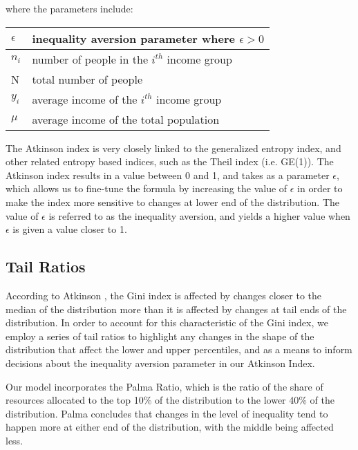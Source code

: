 \documentclass[conference]{IEEEtran}
\begin{document}
\vspace{12pt}

where the parameters include:

\vspace{6pt}

\begin{center}
\begin{tabular}{|l|l|}
\hline
$\epsilon$ & inequality aversion parameter where $\epsilon>0$ \\ \hline
$n_{i}$ & number of people in the $i^{th}$ income group \\ \hline
N & total number of people \\ \hline
$y_{i}$ & average income of the $i^{th}$ income group \\ \hline
$\mu$ & average income of the total population \\ \hline
\end{tabular}
\end{center}

\vspace{6pt}

The Atkinson index is very closely linked to the generalized entropy index, and other related entropy based indices, such as the Theil index (i.e. GE(1)).  The Atkinson index results in a value between 0 and 1, and takes as a parameter $\epsilon$, which allows us to fine-tune the formula by increasing the value of $\epsilon$ in order to make the index more sensitive to changes at lower end of the distribution.  The value of $\epsilon$ is referred to as the inequality aversion, and yields a higher value when $\epsilon$ is given a value closer to 1.

\subsection{Tail Ratios}

According to Atkinson \cite{atkinson1970measurement}, the Gini index is affected by changes closer to the median of the distribution more than it is affected by changes at tail ends of the distribution.  In order to account for this characteristic of the Gini index, we employ a series of tail ratios to highlight any changes in the shape of the distribution that affect the lower and upper percentiles, and as a means to inform decisions about the inequality aversion parameter in our Atkinson Index.

Our model incorporates the Palma Ratio\cite{palma2011homogeneous}, which is the ratio of the share of resources allocated to the top 10\% of the distribution to the lower 40\% of the distribution.  Palma concludes that changes in the level of inequality tend to happen more at either end of the distribution, with the middle being affected less.
\end{document}
